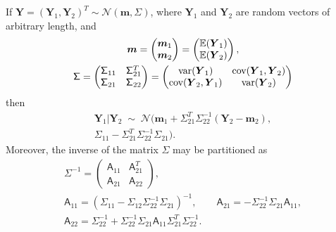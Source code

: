 \documentclass[twocolumn]{svjour3}          %
\newcommand{\bm}[1]{\boldsymbol{#1}}
\newcommand{\mSigma}{\mathsf{\Sigma}}
\newcommand{\Ex}{\mathbb{E}}
\newcommand{\vm}{\bm{m}}
\newcommand{\vY}{\bm{Y}}
\newcommand{\mA}{\mathsf{A}}
\newcommand{\cov}{{\textup{cov}}}
\newcommand{\var}{{\textup{var}}}
\newcommand{\calN}{\mathcal{N}}
\begin{document}
\begin{lemma} \cite[(A.6), (A.11--13)]{RasWil06a} \label{thrm:condDist} If $\vY = (\vY_1, \vY_2)^T \sim \calN (\vm,\mSigma)$, where $\vY_1$ and $\vY_2$ are random vectors of arbitrary length, and 
	\begin{gather*}
	\vm = \begin{pmatrix} \vm_1 \\ \vm_2 \end{pmatrix} = \begin{pmatrix} \Ex(\vY_1) \\ \Ex(\vY_2) \end{pmatrix}, \\
	\mSigma = \begin{pmatrix}
	\mSigma_{11} & \mSigma_{21}^T \\ 	\mSigma_{21} & \mSigma_{22}
	\end{pmatrix} =
	\begin{pmatrix}
	\var(\vY_{1}) & \cov(\vY_{1}, \vY_2) \\ 	\cov(\vY_2,\vY_{1}) & \var(\vY_{2})
	\end{pmatrix} 
	\end{gather*}
	then 
	\begin{multline*}
	\vY_1 \vert \vY_2 \; \sim \; \calN \bigl(\vm_1 + \mSigma_{21}^T \mSigma_{22}^{-1}(\vY_2 - \vm_2), \\ \mSigma_{11} - \mSigma_{21}^T \mSigma_{22}^{-1} \mSigma_{21} \bigr).
	\end{multline*}
Moreover, the inverse of the matrix $\mSigma$ may be partitioned as
\begin{gather*}
\mSigma^{-1} = \begin{pmatrix} \mA_{11} & \mA_{21}^T \\ \mA_{21} & \mA_{22} \end{pmatrix}, \\
\mA_{11} = (\mSigma_{11} - \mSigma_{12} \mSigma_{22}^{-1} \mSigma_{21})^{-1}, \qquad 
\mA_{21} = -  \mSigma_{22}^{-1} \mSigma_{21} \mA_{11}, \\ 
\mA_{22} = \mSigma_{22}^{-1} + \mSigma_{22}^{-1} \mSigma_{21} \mA_{11} \mSigma_{21}^T \mSigma_{22}^{-1}.
\end{gather*}

\end{lemma}
\end{document}
